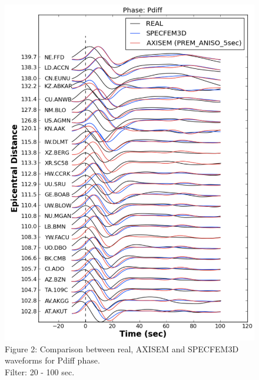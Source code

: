 \documentclass{article}
\begin{document}
\begin{figure}[H]
    \centering
    \begin{minipage}{.5\textwidth}
        \centering
        \includegraphics[width=0.9\linewidth]{AXISEMTutorial-fig010.pdf}
        {\small{}Figure 2: Comparison between real, AXISEM and SPECFEM3D waveforms for 
        Pdiff phase. \\ Filter: 20 - 100 sec.}
    \end{minipage}%
    \begin{minipage}{.5\textwidth}
        \centering

\end{minipage}
\end{figure}
\end{document}
